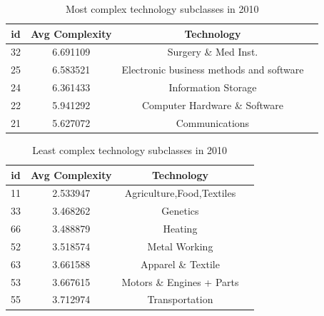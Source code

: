 \documentclass[12pt]{article}
\begin{document}
\newpage
\begin{table}[htbp]\centering \caption{Most complex technology subclasses in 2010 \label{mostcomplex}}
\begin{tabular}{l c c  c}\hline\hline
\multicolumn{1}{c}{\textbf{id}} & \textbf{Avg Complexity} & \textbf{Technology} \\ \hline
32	&6.691109	&Surgery \& Med Inst.\\
25	&6.583521	&Electronic business methods and software\\
24	&6.361433	&Information Storage\\
22	&5.941292	&Computer Hardware \& Software\\
21	&5.627072	&Communications\\
\hline
\end{tabular}
\end{table}

\begin{table}[htbp]\centering \caption{Least complex technology subclasses in 2010 \label{leastcomplex}}
\begin{tabular}{l c c  c}\hline\hline
\multicolumn{1}{c}{\textbf{id}} & \textbf{Avg Complexity} & \textbf{Technology} \\ \hline
11	&2.533947	&Agriculture,Food,Textiles\\
33	&3.468262	&Genetics\\
66	&3.488879	&Heating\\
52	&3.518574	&Metal Working\\
63	&3.661588	&Apparel \& Textile\\
53	&3.667615	&Motors \& Engines + Parts\\
55	&3.712974	&Transportation\\
\hline
\end{tabular}
\end{table}

\newpage

\newpage

\newpage
\begin{landscape}

\end{landscape}
\newpage

\newpage

\newpage

\newpage

\newpage

\newpage

\newpage

\end{document}
